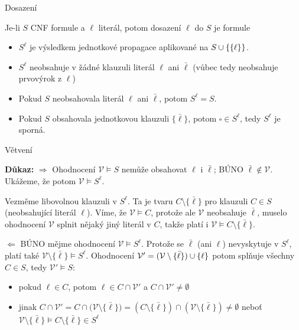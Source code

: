 \documentclass{beamer}
\begin{document}
\begin{frame}{Dosazení}

    
    Je-li $S$ CNF formule a $\ell$ literál, potom \alert{dosazení} $\ell$ do $S$ je formule
    \pause
        
    \begin{itemize}
        \item $S^\ell$ je výsledkem \alert{jednotkové propagace} aplikované na $S\mathbin{\cup}\{\{\ell\}\}$.\pause
        \item $S^\ell$ neobsahuje v žádné klauzuli literál $\ell$ ani $\bar\ell$ (vůbec tedy neobsahuje prvovýrok z $\ell$)\pause
        \item Pokud $S$ neobsahovala literál $\ell$ ani $\bar\ell$, potom $S^\ell=S$.\pause
        \item Pokud $S$ obsahovala jednotkovou klauzuli $\{\bar\ell\}$, potom $\square\in S^\ell$, tedy $S^\ell$ je sporná.
    \end{itemize} 

\end{frame}


\begin{frame}{Větvení}
    
    \pause

    \textbf{Důkaz:} \alert{$\Rightarrow$} Ohodnocení $\mathcal V\models S$ nemůže obsahovat $\ell$ i $\bar\ell$; BÚNO \alert{$\bar\ell\notin\mathcal V$}. \pause Ukážeme, že potom $\mathcal V\models S^\ell$. \pause
    
    Vezměme libovolnou klauzuli v $S^\ell$. Ta je tvaru $C\setminus\{\bar\ell\}$ pro klauzuli $C\in S$ (neobsahující literál $\ell$).
     \pause Víme, že $\mathcal V\models C$, protože ale $\mathcal V$ neobsahuje $\bar\ell$, muselo ohodnocení $\mathcal V$ splnit nějaký jiný literál v $C$, takže platí i $\mathcal V\models C\setminus\{\bar\ell\}$.\pause

    \alert{$\Leftarrow$} BÚNO mějme ohodnocení \alert{$\mathcal V\models S^\ell$}. \pause Protože se $\bar\ell$ (ani $\ell$) nevyskytuje v $S^\ell$, platí také \alert{$\mathcal V\setminus\{\bar\ell\}\models S^\ell$}. \pause Ohodnocení \alert{$\mathcal V'=(\mathcal V\setminus\{\bar\ell\})\mathbin{\cup}\{\ell\}$} potom splňuje všechny $C\in S$, tedy $\mathcal V'\models S$: \pause
    \begin{itemize}
        \item pokud $\ell\in C$, potom $\ell\in C\cap\mathcal V'$ a $C\cap\mathcal V'\neq\emptyset$\pause
        \item jinak $C\cap\mathcal V'=C\cap\mathcal (\mathcal V\setminus\{\bar\ell\})=(C\setminus\{\bar\ell\})\cap(\mathcal V\setminus\{\bar\ell\})\neq\emptyset$ \pause neboť $\mathcal V\setminus\{\bar\ell\}\models C\setminus\{\bar\ell\}\in S^\ell$\hfill\qedsymbol
    \end{itemize}

\end{frame}
\end{document}
